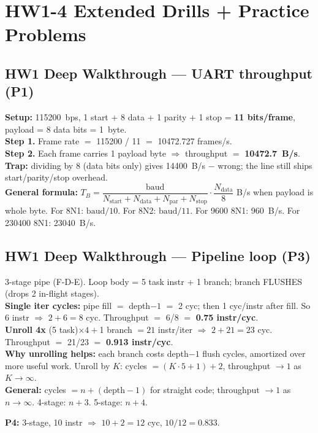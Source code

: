 \section{HW1-4 Extended Drills + Practice Problems}

\subsection{HW1 Deep Walkthrough --- UART throughput (P1)}
\textbf{Setup:} 115200~bps, 1 start + 8 data + 1 parity + 1 stop = \textbf{11 bits/frame}, payload = 8 data bits = 1~byte.\\
\textbf{Step 1.} Frame rate $=$ 115200 / 11 $=$ 10472.727 frames/s.\\
\textbf{Step 2.} Each frame carries 1 payload byte $\Rightarrow$ throughput $=$ \textbf{10472.7~B/s}.\\
\textbf{Trap:} dividing by 8 (data bits only) gives 14400~B/s $-$ wrong; the line still ships start/parity/stop overhead.\\
\textbf{General formula:} $T_B = \dfrac{\text{baud}}{N_{\text{start}}+N_{\text{data}}+N_{\text{par}}+N_{\text{stop}}}\cdot\dfrac{N_{\text{data}}}{8}$ B/s when payload is whole byte. For 8N1: $\text{baud}/10$. For 8N2: $\text{baud}/11$. For 9600 8N1: 960~B/s. For 230400 8N1: 23040~B/s.

\subsection{HW1 Deep Walkthrough --- Pipeline loop (P3)}
3-stage pipe (F-D-E). Loop body = 5 task instr + 1 branch; branch FLUSHES (drops 2 in-flight stages).\\
\textbf{Single iter cycles:} pipe fill $=$ depth$-1$ $=$ 2 cyc; then 1 cyc/instr after fill. So 6 instr $\Rightarrow$ $2 + 6 = 8$ cyc. Throughput $=$ 6/8 $=$ \textbf{0.75 instr/cyc}.\\
\textbf{Unroll 4x} (5 task)$\times 4 + $1 branch $= 21$ instr/iter $\Rightarrow$ $2 + 21 = 23$ cyc. Throughput $=$ 21/23 $=$ \textbf{0.913 instr/cyc}.\\
\textbf{Why unrolling helps:} each branch costs depth$-1$ flush cycles, amortized over more useful work. Unroll by $K$: cycles $=(K\cdot 5 + 1)+2$, throughput $\to 1$ as $K\to\infty$.\\
\textbf{General:} cycles $= n + (\text{depth}-1)$ for straight code; throughput $\to 1$ as $n\to\infty$. 4-stage: $n+3$. 5-stage: $n+4$.
\begin{hwp}\textbf{P4:} 3-stage, 10 instr $\Rightarrow$ $10+2=12$ cyc, $10/12=$0.833.\end{hwp}

